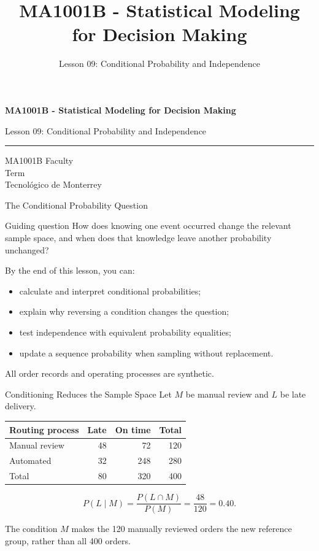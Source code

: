 \documentclass[aspectratio=169,10pt,english]{beamer}
\title{MA1001B - Statistical Modeling for Decision Making}
\subtitle{Lesson 09: Conditional Probability and Independence}
\author{}
\institute{Tecnol\'ogico de Monterrey}
\date{}
\begin{document}
\begin{frame}[plain]
  \vspace{1.2cm}
  {\Large\bfseries MA1001B - Statistical Modeling for Decision Making\par}
  \vspace{0.7cm}
  {\large Lesson 09: Conditional Probability and Independence\par}
  \vspace{0.7cm}
  {\color{TecRojo}\rule{\textwidth}{1.2pt}}
  \vspace{0.8cm}

  MA1001B Faculty\\[0.3cm]
  Term\\[0.3cm]
  Tecnol\'ogico de Monterrey
\end{frame}

\begin{frame}{The Conditional Probability Question}
  \begin{alertblock}{Guiding question}
    How does knowing one event occurred change the relevant sample space, and
    when does that knowledge leave another probability unchanged?
  \end{alertblock}

  \vspace{0.4em}
  By the end of this lesson, you can:
  \begin{itemize}
    \item calculate and interpret conditional probabilities;
    \item explain why reversing a condition changes the question;
    \item test independence with equivalent probability equalities;
    \item update a sequence probability when sampling without replacement.
  \end{itemize}

  \vfill
  \scriptsize All order records and operating processes are synthetic.
\end{frame}

\begin{frame}{Conditioning Reduces the Sample Space}
  \small
  Let $M$ be manual review and $L$ be late delivery.

  \begin{center}
    \begin{tabular}{lrrr}
      \toprule
      \textbf{Routing process} & \textbf{Late} & \textbf{On time} & \textbf{Total} \\
      \midrule
      Manual review & 48 & 72 & 120 \\
      Automated & 32 & 248 & 280 \\
      \midrule
      Total & 80 & 320 & 400 \\
      \bottomrule
    \end{tabular}
  \end{center}

  \[
    P(L\mid M)=\frac{P(L\cap M)}{P(M)}=\frac{48}{120}=0.40.
  \]

  The condition $M$ makes the 120 manually reviewed orders the new reference
  group, rather than all 400 orders.
\end{frame}
\end{document}
